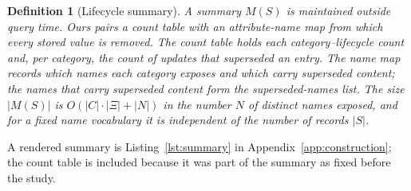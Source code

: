 \documentclass{article}
\newtheorem{definition}{Definition}
\begin{document}
\begin{definition}[Lifecycle summary]\label{def:index}
A summary $M(S)$ is maintained outside query time. Ours pairs a count table with an attribute-name map from which every stored value is removed. The count table holds each category--lifecycle count and, per category, the count of updates that superseded an entry. The name map records which names each category exposes and which carry superseded content; the names that carry superseded content form the superseded-names list. The size $|M(S)|$ is $O(|C|\cdot|\Xi|+|N|)$ in the number $N$ of distinct names exposed, and for a fixed name vocabulary it is independent of the number of records $|S|$.
\end{definition}
A rendered summary is Listing~\ref{lst:summary} in Appendix~\ref{app:construction}; the count table is included because it was part of the summary as fixed before the study.
\end{document}
